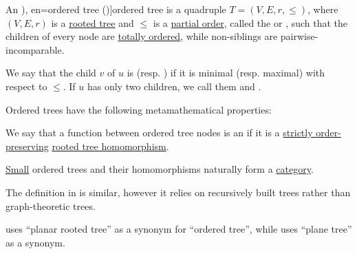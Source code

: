 \begin{definition}\label{def:ordered_tree}\mimprovised
  An \term[ru=упорядоченное дерево (\cite[\S 9.3.5]{Новиков2013ДискретнаяМатематика}), en=ordered tree (\cite[573]{Stanley2012EnumerativeCombinatoricsVol1})]{ordered tree} is a quadruple \( T = (V, E, r, \leq) \), where \( (V, E, r) \) is a \hyperref[def:rooted_tree]{rooted tree} and \( {\leq} \) is a \hyperref[def:partially_ordered_set]{partial order}, called the  or , such that the children of every node are \hyperref[def:totally_ordered_set]{totally ordered}, while non-siblings are pairwise-incomparable.

  \begin{thmenum}[series=def:ordered_tree]
     We say that the child \( v \) of \( u \) is  (resp. ) if it is minimal (resp. maximal) with respect to \( {\leq} \). If \( u \) has only two children, we call them  and .
  \end{thmenum}

  Ordered trees have the following metamathematical properties:
  \begin{thmenum}
     We say that a function between ordered tree nodes is an  if it is a \hyperref[def:order_function/preserving]{strictly order-preserving} \hyperref[def:rooted_tree/morphism]{rooted tree homomorphism}.

     \hyperref[def:small_set]{Small} ordered trees and their homomorphisms naturally form a \hyperref[def:category]{category}.
  \end{thmenum}
\end{definition}
\begin{comments}
  \item The definition in \cite[573]{Stanley2012EnumerativeCombinatoricsVol1} is similar, however it relies on recursively built trees rather than graph-theoretic trees.

  \item \Textcite[\S 2.3]{Holtkamp2011RootedTrees} uses \enquote{planar rooted tree} as a synonym for \enquote{ordered tree}, while \cite[573]{Stanley2012EnumerativeCombinatoricsVol1} uses \enquote{plane tree} as a synonym.
\end{comments}

